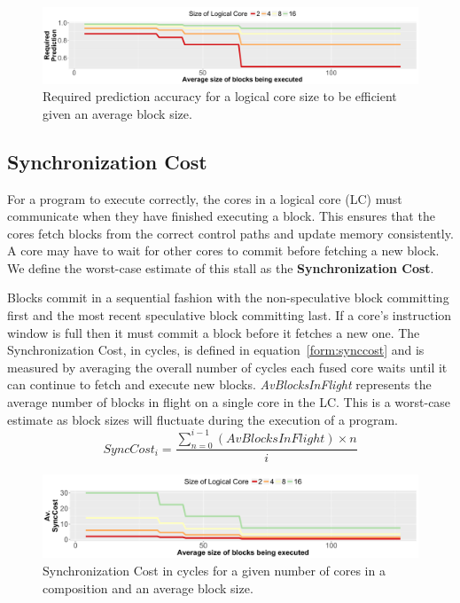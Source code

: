 \begin{figure}[t]
    \centering
    \includegraphics[width=\textwidth]{cases-paper/graphics/limit_study/prediction_req.pdf}
\vspace*{-5mm}
    \caption{Required prediction accuracy for a logical core size to be efficient given an average block size.}
    \label{fig:req_pred}
\vspace{5mm}
\end{figure}
\subsection{Synchronization Cost}


For a program to execute correctly, the cores in a logical core (LC) must communicate when they have finished executing a block. 
This ensures that the cores fetch blocks from the correct control paths and update memory consistently.
A core may have to wait for other cores to commit before fetching a new block. 
We define the worst-case estimate of this stall as the \textbf{Synchronization Cost}.

Blocks commit in a sequential fashion with the non-speculative block committing first and the most recent speculative block committing last.
If a core's instruction window is full then it must commit a block before it fetches a new one.
The Synchronization Cost, in cycles, is defined in equation~\ref{form:synccost} and is measured by averaging the overall number of cycles each fused core waits until it can continue to fetch and execute new blocks.
\textit{AvBlocksInFlight} represents the average number of blocks in flight on a single core in the LC.
This is a worst-case estimate as block sizes will fluctuate during the execution of a program.
\vspace{5mm}
\begin{equation}\label{form:synccost}
SyncCost_i = \frac{\sum_{n=0}^{i-1}\left(AvBlocksInFlight \right) \times n }{i}
\end{equation}
\vspace{5mm}

\begin{figure}[t]
    \centering
    \includegraphics[width=\textwidth]{cases-paper/graphics/limit_study/sync_cost.pdf}
\vspace*{-5mm}
    \caption{Synchronization Cost in cycles for a given number of cores in a composition and an average block size.} %
    \label{fig:sync_cost}
\end{figure}


